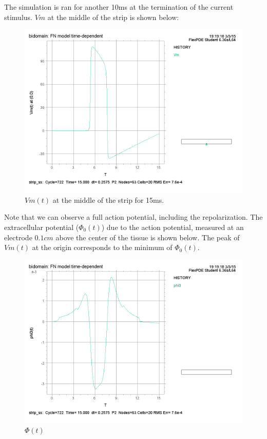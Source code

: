 \documentclass{article}
\begin{document}
The simulation is ran for another 10ms at the termination of the current stimulus. $Vm$ at the middle of the strip is shown below:

\begin{figure}[H]
    \begin{center}
        \includegraphics[scale=0.5]{1Dstrip_VmOrigin_tmax=15ms.png}
        \caption{$Vm(t)$ at the middle of the strip for 15ms.}
    \end{center}
\end{figure}

Note that we can observe a full action potential, including the repolarization. The extracellular potential ($\Phi_0(t)$) due to the action potential, measured at an electrode $0.1cm$ above the center of the tissue is shown below. The peak of $Vm(t)$ at the origin corresponds to the minimum of $\Phi_0(t)$.

\begin{figure}[H]
    \begin{center}
        \includegraphics[scale=0.5]{1Dstrip_Phi0_Origin_tmax=15ms.png}
        \caption{$\Phi(t)$}
    \end{center}
\end{figure}
\end{document}
